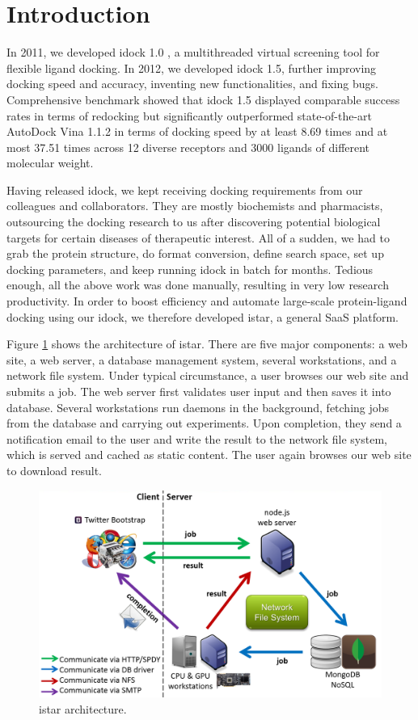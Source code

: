 \documentclass{bioinfo}
\begin{document}
\section{Introduction}

In 2011, we developed idock 1.0 \citep{1153}, a multithreaded virtual screening tool for flexible ligand docking. In 2012, we developed idock 1.5, further improving docking speed and accuracy, inventing new functionalities, and fixing bugs. Comprehensive benchmark showed that idock 1.5 displayed comparable success rates in terms of redocking but significantly outperformed state-of-the-art AutoDock Vina 1.1.2 \citep{595} in terms of docking speed by at least 8.69 times and at most 37.51 times across 12 diverse receptors and 3000 ligands of different molecular weight.

Having released idock, we kept receiving docking requirements from our colleagues and collaborators. They are mostly biochemists and pharmacists, outsourcing the docking research to us after discovering potential biological targets for certain diseases of therapeutic interest. All of a sudden, we had to grab the protein structure, do format conversion, define search space, set up docking parameters, and keep running idock in batch for months. Tedious enough, all the above work was done manually, resulting in very low research productivity. In order to boost efficiency and automate large-scale protein-ligand docking using our idock, we therefore developed istar, a general SaaS platform.

Figure \ref{istar:architecture} shows the architecture of istar. There are five major components: a web site, a web server, a database management system, several workstations, and a network file system. Under typical circumstance, a user browses our web site and submits a job. The web server first validates user input and then saves it into database. Several workstations run daemons in the background, fetching jobs from the database and carrying out experiments. Upon completion, they send a notification email to the user and write the result to the network file system, which is served and cached as static content. The user again browses our web site to download result.

\begin{figure}
\centerline{\includegraphics[width=\linewidth]{../istar/Architecture.png}}
\caption{istar architecture.}\label{istar:architecture}
\end{figure}
\end{document}
